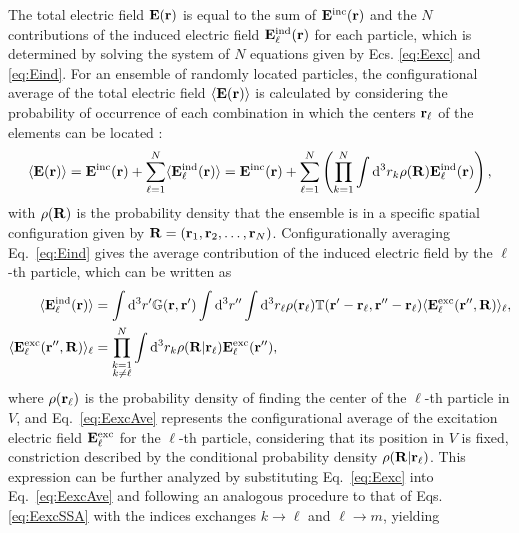 The total electric field $\vb{E}(\vb{r})$ is equal to the sum of $\vb{E}^\text{inc}(\vb{r})$ and the $N$ contributions of the induced electric field $\vb{E}^\text{ind}_\ell(\vb{r})$ for each particle, which is determined by solving the system of $N$ equations given by Ecs. \eqref{eq:Eexc} and \eqref{eq:Eind}. For an ensemble of randomly located particles, the configurational average of the total electric field $\langle\vb{E}(\vb{r})\rangle$ is calculated by considering the probability of occurrence of each combination in which the centers $\vb{r}_\ell$ of the elements can be located \cite{garcia2012multiple,barrera_coherent_2003}:
%
\begin{align}
	\langle\vb{E}(\vb{r})\rangle =
	\vb{E}^\text{inc}(\vb{r}) + \sum_{\ell = 1}^N \langle  \vb{E}^\text{ind}_\ell  (\vb{r})\rangle
	= \vb{E}^\text{inc}(\vb{r}) +  \sum_{\ell = 1}^N  \left(\prod_{k = 1}^N \int\dd^3 r_k \rho(\vb{R}) \vb{E}^\text{ind}_\ell(\vb{r})\right),
	\label{eq:Eave}
\end{align}
%
with $\rho(\vb{R})$ is the probability density that the ensemble is in a specific spatial configuration given by $\vb{R} = (\vb{r}_1,\vb{r}_2,\ldots,\vb{r}_N)$. Configurationally averaging Eq.~\eqref{eq:Eind} gives the average contribution of the induced electric field by the $\ell$-th particle, which can be written as \cite{barrera_coherent_2003,garcia2012multiple}
%
\begin{subequations}%
	\begin{align}%
		\langle \vb{E}^\text{ind}_\ell(\vb{r}) \rangle &= \int\dd^3 r'\mathbb{G}(\vb{r},\vb{r}')
		\int\dd^3 r'' \int \dd^3 r_\ell \rho(\vb{r}_\ell) \mathbb{T}(\vb{r}'-\vb{r}_\ell,\vb{r}''-\vb{r}_\ell)
		\langle \vb{E}_\ell^\text{exc}(\vb{r}'',\vb{R})\rangle_\ell,%
		\\
		\langle \vb{E}_\ell^\text{exc}(\vb{r}'',\vb{R})\rangle_\ell
		&= \prod_{\substack{k =1 \\ k\neq \ell}}^N  \int\dd^3 r_k \rho(\vb{R}|\vb{r}_\ell) \vb{E}^\text{exc}_\ell(\vb{r}''),
		\label{eq:EexcAve}
	\end{align}%
	\label{eq:EexcSSA}%
\end{subequations}%
%
where $\rho(\vb{r}_\ell)$ is the probability density of finding the center of the $\ell$-th particle in $V$, and Eq.~\eqref{eq:EexcAve} represents the configurational average of the excitation electric field $\vb{E}_\ell^\text{exc}$ for the $\ell$-th particle, considering that its position in $V$ is fixed, constriction described by the conditional probability density $\rho(\vb{R}|\vb{r}_\ell)$. This expression can be further analyzed by substituting Eq.~\eqref{eq:Eexc} into Eq.~\eqref{eq:EexcAve} and following an analogous procedure to that of Eqs. \eqref{eq:EexcSSA} with the indices exchanges $k\to\ell$ and $\ell \to m$, yielding
